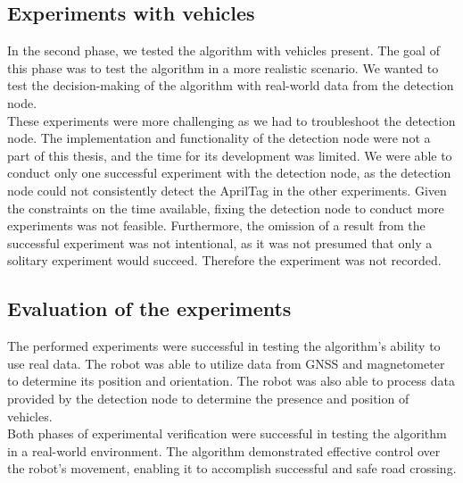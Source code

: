     \subsection{Experiments with vehicles}
        In the second phase, we tested the algorithm with vehicles present. The goal of this phase was to test the algorithm in a more realistic scenario. We wanted to test the decision-making of the algorithm with real-world data from the detection node.\\
        These experiments were more challenging as we had to troubleshoot the detection node. The implementation and functionality of the detection node were not a part of this thesis, and the time for its development was limited. We were able to conduct only one successful experiment with the detection node, as the detection node could not consistently detect the AprilTag in the other experiments. Given the constraints on the time available, fixing the detection node to conduct more experiments was not feasible. Furthermore, the omission of a result from the successful experiment was not intentional, as it was not presumed that only a solitary experiment would succeed. Therefore the experiment was not recorded.

    \subsection{Evaluation of the experiments}
        The performed experiments were successful in testing the algorithm's ability to use real data. The robot was able to utilize data from GNSS and magnetometer to determine its position and orientation. The robot was also able to process data provided by the detection node to determine the presence and position of vehicles.\\
        Both phases of experimental verification were successful in testing the algorithm in a real-world environment. The algorithm demonstrated effective control over the robot's movement, enabling it to accomplish successful and safe road crossing.

